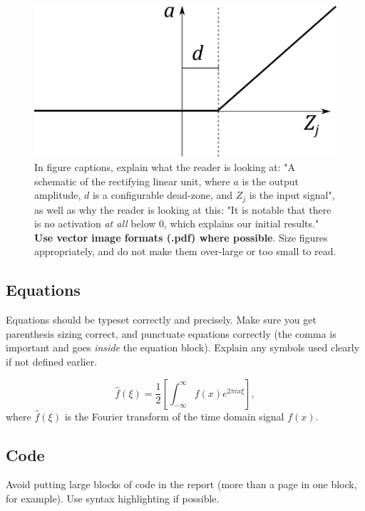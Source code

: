 \documentclass{l4proj}
\begin{document}
\begin{figure}
    \centering
    \includegraphics[width=0.5\linewidth]{images/relu.pdf}    

    \caption{In figure captions, explain what the reader is looking at: "A schematic of the rectifying linear unit, where $a$ is the output amplitude,
    $d$ is a configurable dead-zone, and $Z_j$ is the input signal", as well as why the reader is looking at this: 
    "It is notable that there is no activation \emph{at all} below 0, which explains our initial results." 
    \textbf{Use vector image formats (.pdf) where possible}. Size figures appropriately, and do not make them over-large or too small to read.
    }

    \label{fig:relu} 
\end{figure}

\subsection{Equations}

Equations should be typeset correctly and precisely. Make sure you get parenthesis sizing correct, and punctuate equations correctly 
(the comma is important and goes \textit{inside} the equation block). Explain any symbols used clearly if not defined earlier. 

\begin{equation}
    \hat{f}(\xi) = \frac{1}{2}\left[ \int_{-\infty}^{\infty} f(x) e^{2\pi i x \xi} \right],
\end{equation}    
where $\hat{f}(\xi)$ is the Fourier transform of the time domain signal $f(x)$.

\subsection{Code}

Avoid putting large blocks of code in the report (more than a page in one block, for example). Use syntax highlighting if possible.
\end{document}
